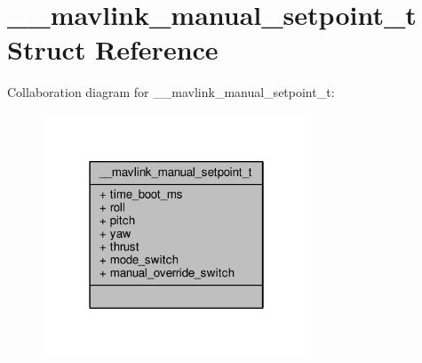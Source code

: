 \hypertarget{struct____mavlink__manual__setpoint__t}{\section{\+\_\+\+\_\+mavlink\+\_\+manual\+\_\+setpoint\+\_\+t Struct Reference}
\label{struct____mavlink__manual__setpoint__t}
}


Collaboration diagram for \+\_\+\+\_\+mavlink\+\_\+manual\+\_\+setpoint\+\_\+t\+:
\nopagebreak
\begin{figure}[H]
\begin{center}
\leavevmode
\includegraphics[width=226pt]{struct____mavlink__manual__setpoint__t__coll__graph}
\end{center}
\end{figure}
